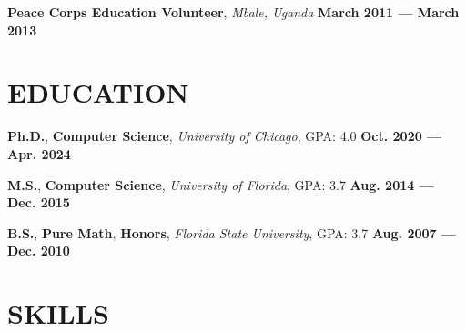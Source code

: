 \documentclass[11pt,letterpaper,roman,colorlinks,linkcolor=blue]{moderncv}
\newcommand*{\modern}{\fontfamily{qhv}\selectfont}
\newcommand{\mystyle}[1]{\textcolor{mygrey}{\modern #1}}
\newcommand{\mysectionstyle}[1]{\large\mystyle{#1}}
\begin{document}
\textbf{Peace Corps Education Volunteer}, \emph{Mbale, Uganda}
\hfill \textbf{March 2011 --- March 2013}


\section{\mysectionstyle{EDUCATION}}

\textbf{Ph.D.}, \textbf{Computer Science}, \emph{University of Chicago}, GPA: 4.0
\hfill \textbf{Oct. 2020 --- Apr. 2024}

\textbf{M.S.}, \textbf{Computer Science}, \emph{University of Florida}, GPA: 3.7
\hfill \textbf{Aug. 2014 --- Dec. 2015}

\textbf{B.S.}, \textbf{Pure Math}, \textbf{Honors}, \emph{Florida State University}, GPA: 3.7
\hfill \textbf{Aug. 2007 --- Dec. 2010}


\section{\mysectionstyle{SKILLS}}
\end{document}
